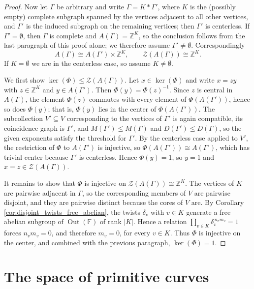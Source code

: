 \documentclass[12pt,a4paper]{amsart}
\numberwithin{equation}{section}
\DeclareMathOperator{\Out}{Out}
\newcommand{\FF}{\mathbb{F}}
\newcommand{\ZZ}{\mathbb{Z}}
\theoremstyle{plain}
\theoremstyle{definition}
\theoremstyle{remark}
\begin{document}
\begin{proof}
    Now let $\Gamma$ be arbitrary and write $\Gamma = K * \Gamma'$, where $K$ is the (possibly empty) complete subgraph spanned by the vertices adjacent to all other vertices, and $\Gamma'$ is the induced subgraph on the remaining vertices; then $\Gamma'$ is centerless.
    If $\Gamma' = \emptyset$, then $\Gamma$ is complete and $A(\Gamma) = \ZZ^{K}$, so the conclusion follows from the last paragraph of this proof alone; we therefore assume $\Gamma' \ne \emptyset$.
    Correspondingly
    \[
        A(\Gamma) \cong A(\Gamma') \times \ZZ^{K},
        \qquad
        \mathcal{Z}(A(\Gamma)) \cong \ZZ^{K} .
    \]
    If $K = \emptyset$ we are in the centerless case, so assume $K \ne \emptyset$.

    We first show $\ker(\Phi) \le \mathcal{Z}(A(\Gamma))$.
    Let $x \in \ker(\Phi)$ and write $x = zy$ with $z \in \ZZ^{K}$ and $y \in A(\Gamma')$.
    Then $\Phi(y) = \Phi(z)^{-1}$.
    Since $z$ is central in $A(\Gamma)$, the element $\Phi(z)$ commutes with every element of $\Phi(A(\Gamma'))$, hence so does $\Phi(y)$; that is, $\Phi(y)$ lies in the center of $\Phi(A(\Gamma'))$.
    The subcollection $V' \subseteq V$ corresponding to the vertices of $\Gamma'$ is again compatible, its coincidence graph is $\Gamma'$, and $M(\Gamma') \le M(\Gamma)$ and $D(\Gamma') \le D(\Gamma)$, so the given exponents satisfy the threshold for $\Gamma'$.
    By the centerless case applied to $V'$, the restriction of $\Phi$ to $A(\Gamma')$ is injective, so $\Phi(A(\Gamma')) \cong A(\Gamma')$, which has trivial center because $\Gamma'$ is centerless.
    Hence $\Phi(y) = 1$, so $y = 1$ and $x = z \in \mathcal{Z}(A(\Gamma))$.

    It remains to show that $\Phi$ is injective on $\mathcal{Z}(A(\Gamma)) \cong \ZZ^{K}$.
    The vertices of $K$ are pairwise adjacent in $\Gamma$, so the corresponding members of $V$ are pairwise disjoint, and they are pairwise distinct because the cores of $V$ are.
    By Corollary \ref{cor:disjoint_twists_free_abelian}, the twists $\delta_v$ with $v \in K$ generate a free abelian subgroup of $\Out(\FF)$ of rank $\lvert K \rvert$.
    Hence a relation $\prod_{v \in K} \delta_v^{\,n_v m_v} = 1$ forces $n_v m_v = 0$, and therefore $m_v = 0$, for every $v \in K$.
    Thus $\Phi$ is injective on the center, and combined with the previous paragraph, $\ker(\Phi) = 1$.
\end{proof}





\section{The space of primitive curves}
\end{document}
